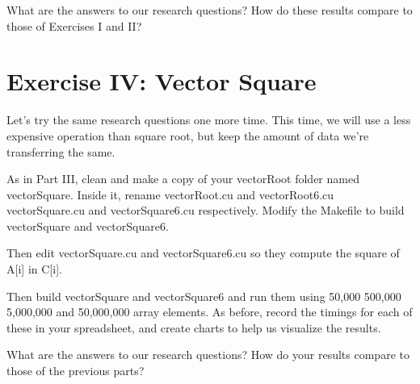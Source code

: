 \documentclass[letterpaper,10pt,openany,oneside]{sphinxmanual}
\begin{document}
What are the answers to our research questions?
How do these results compare to those of Exercises I and II?


\section{Exercise IV: Vector Square}
\label{2-MoreExercises/MoreExercises:exercise-iv-vector-square}
Let's try the same research questions one more time.
This time, we will use a less expensive operation than square root,
but keep the amount of data we're transferring the same.

As in Part III, clean and make a copy of your vectorRoot folder named vectorSquare.
Inside it, rename vectorRoot.cu and vectorRoot6.cu vectorSquare.cu and vectorSquare6.cu respectively.
Modify the Makefile to build vectorSquare and vectorSquare6.

Then edit vectorSquare.cu and vectorSquare6.cu so they compute the square of A{[}i{]} in C{[}i{]}.

Then build vectorSquare and vectorSquare6 and run them using 50,000
500,000 5,000,000 and 50,000,000 array elements.
As before, record the timings for each of these in your spreadsheet,
and create charts to help us visualize the results.

What are the answers to our research questions?
How do your results compare to those of the previous parts?



\renewcommand{\indexname}{Index}
\printindex
\end{document}
